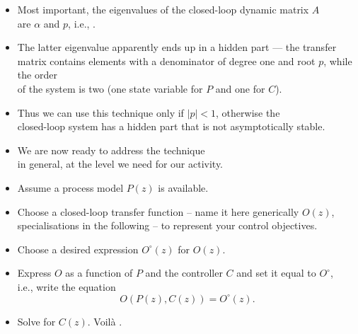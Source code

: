 \begin{frame}
\myPause
 \begin{itemize}[<+-| alert@+>]
 \item Most important, the eigenvalues of the closed-loop dynamic matrix $A$\\
       are $\alpha$ and $p$, i.e., .
 \item The latter eigenvalue apparently ends up in a hidden part --- the transfer matrix
       contains elements with a denominator of degree one and root $p$, while the order\\
       of the system is two (one state variable for $P$ and one for $C$).
 \item Thus we can use this technique only if $|p|<1$, otherwise the\\
       closed-loop system has a hidden part that is not asymptotically stable.
 \item \vfill We are now ready to address the  technique\\
       in general, at the level we need for our activity.
 \end{itemize}
\end{frame}

\begin{frame}
\myPause
 \begin{itemize}[<+-| alert@+>]
 \item Assume a process model $P(z)$ is available.
 \item Choose a closed-loop transfer function -- name it here generically $O(z)$, specialisations
       in the following -- to represent your control objectives.
 \item Choose a desired expression $O^{\circ}(z)$ for $O(z)$.
 \item Express $O$ as a function of $P$ and the controller $C$ and set it equal to $O^{\circ}$,\\
       i.e., write the equation
       \begin{displaymath} 
       O \left( P(z),C(z) \right) = O^{\circ}(z).
       \end{displaymath}
 \item Solve for $C(z)$. Voil\`{a} \smiley.
 \end{itemize}
\end{frame}

